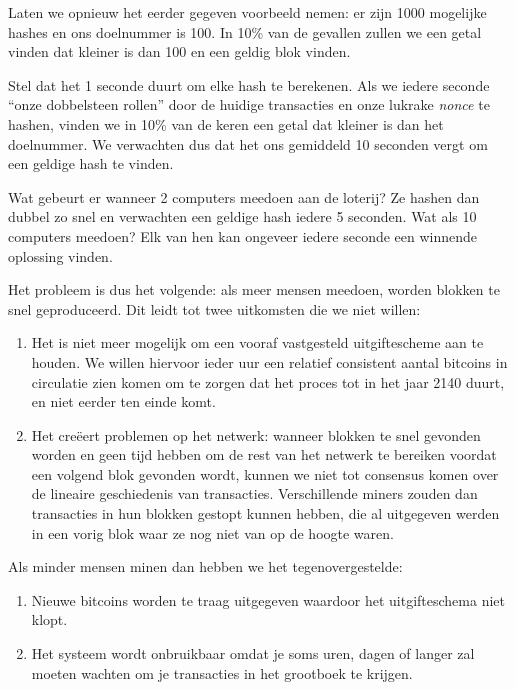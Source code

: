 Laten we opnieuw het eerder gegeven voorbeeld nemen: er zijn 1000 mogelijke hashes en ons doelnummer is 100. In 10\% van de gevallen zullen we een getal vinden dat kleiner is dan 100 en een geldig blok vinden.

Stel dat het 1 seconde duurt om elke hash te berekenen. Als we iedere seconde “onze dobbelsteen rollen” door de huidige transacties en onze lukrake \textit{nonce} te hashen, vinden we in 10\% van de keren een getal dat kleiner is dan het doelnummer. We verwachten dus dat het ons gemiddeld 10 seconden vergt om een geldige hash te vinden.

Wat gebeurt er wanneer 2 computers meedoen aan de loterij? Ze hashen dan dubbel zo snel en verwachten een geldige hash iedere 5 seconden. Wat als 10 computers meedoen? Elk van hen kan ongeveer iedere seconde een winnende oplossing vinden.

Het probleem is dus het volgende: als meer mensen meedoen, worden blokken te snel geproduceerd. Dit leidt tot twee uitkomsten die we niet willen:

\begin{enumerate}
    \item Het is niet meer mogelijk om een vooraf vastgesteld uitgiftescheme aan te houden. We willen hiervoor ieder uur een relatief consistent aantal bitcoins in circulatie zien komen om te zorgen dat het proces tot in het jaar 2140 duurt, en niet eerder ten einde komt.
    \item Het creëert problemen op het netwerk: wanneer blokken te snel gevonden worden en geen tijd hebben om de rest van het netwerk te bereiken voordat een volgend blok gevonden wordt, kunnen we niet tot consensus komen over de lineaire geschiedenis van transacties. Verschillende miners zouden dan transacties in hun blokken gestopt kunnen hebben, die al uitgegeven werden in een vorig blok waar ze nog niet van op de hoogte waren.
\end{enumerate}

Als minder mensen minen dan hebben we het tegenovergestelde:

\begin{enumerate}
    \item Nieuwe bitcoins worden te traag uitgegeven waardoor het uitgifteschema niet klopt.
    \item Het systeem wordt onbruikbaar omdat je soms uren, dagen of langer zal moeten wachten om je transacties in het grootboek te krijgen.
\end{enumerate}

